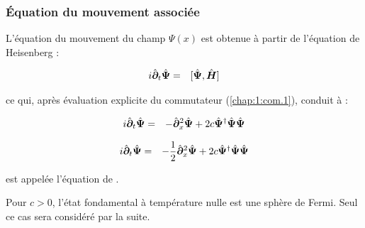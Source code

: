 \subsubsection{Équation du mouvement associée}

L’équation du mouvement du champ \( \Psi(x) \) est obtenue à partir de l’équation de Heisenberg :

\begin{eqnarray}
	i\hat{\bm{\partial}}_t	\hat{\bm{\Psi}} & = & [ \hat{\bm{\Psi}} , \hat{\bm{H}} ]
\end{eqnarray}

ce qui, après évaluation explicite du commutateur (\ref{chap:1:com.1}), conduit à :


\begin{eqnarray}
	i \hat{\bm{\partial}}_t \hat{\bm{\Psi}}	 & = & - \hat{\bm{\partial}}_x^2 \hat{\bm{\Psi}} + 2c \hat{\bm{\Psi}}^\dag\hat{\bm{\Psi}} \hat{\bm{\Psi}}
\end{eqnarray}

\begin{eqnarray}
	i \hat{\bm{\partial}}_t \hat{\bm{\Psi}}	 & = & - \frac{1}{2}\hat{\bm{\partial}}_x^2 \hat{\bm{\Psi}} + 2c \hat{\bm{\Psi}}^\dag\hat{\bm{\Psi}} \hat{\bm{\Psi}}
\end{eqnarray}

est appelée l'équation de .

Pour $c > 0$, l'état fondamental à température nulle est une sphère de Fermi. Seul ce cas sera considéré par la suite.





 
